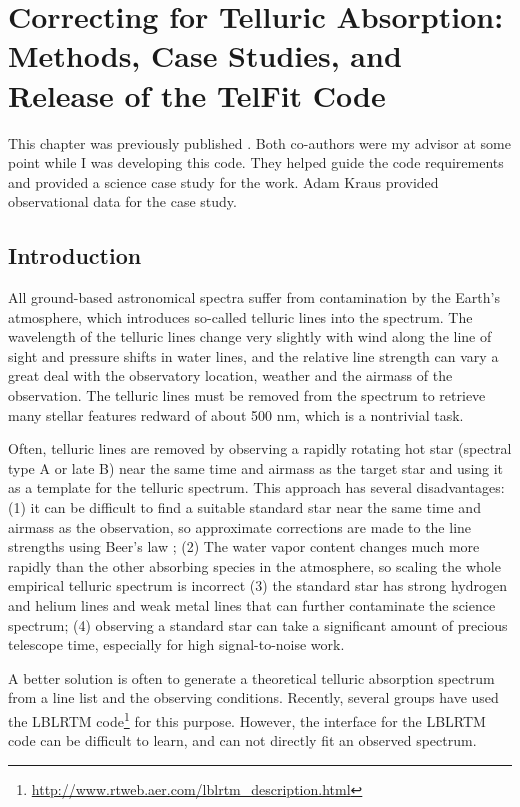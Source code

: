 
\chapter{Correcting for Telluric Absorption: Methods, Case Studies, and Release of the TelFit Code}
\label{chap:telfit}
This chapter was previously published \citep{Gullikson2014}. Both co-authors were my advisor at some point while I was developing this code. They helped guide the code requirements and provided a science case study for the work. Adam Kraus provided observational data for the case study.

\section{Introduction}
All ground-based astronomical spectra suffer from contamination by the Earth's atmosphere, which introduces so-called telluric lines into the spectrum. The wavelength of the telluric lines change very slightly with wind along the line of sight and pressure shifts in water lines, and the relative line strength can vary a great deal with the observatory location, weather and the airmass of the observation. The telluric lines must be removed from the spectrum to retrieve many stellar features redward of about 500 nm, which is a nontrivial task.

Often, telluric lines are removed by observing a rapidly rotating hot star (spectral type A or late B) near the same time and airmass as the target star and using it as a template for the telluric spectrum. This approach has several disadvantages: (1) it can be difficult to find a suitable standard star near the same time and airmass as the observation, so approximate corrections are made to the line strengths using Beer's law \citep{Beer1852}; (2) The water vapor content changes much more rapidly than the other absorbing species in the atmosphere, so scaling the whole empirical telluric spectrum is incorrect (3) the standard star has strong hydrogen and helium lines and weak metal lines that can further contaminate the science spectrum; (4) observing a standard star can take a significant amount of precious telescope time, especially for high signal-to-noise work.

A better solution is often to generate a theoretical telluric absorption spectrum from a line list and the observing conditions. Recently, several groups \citep{Seifahrt2011, Bertaux2013, Husser2013, Cotton2013, Gullikson2013} have used the LBLRTM code\footnote{\url{http://www.rtweb.aer.com/lblrtm_description.html}} \citep[][Line By Line Radiative Transfer Model]{Clough2005} for this purpose. However, the interface for the LBLRTM code can be difficult to learn, and can not directly fit an observed spectrum. 

